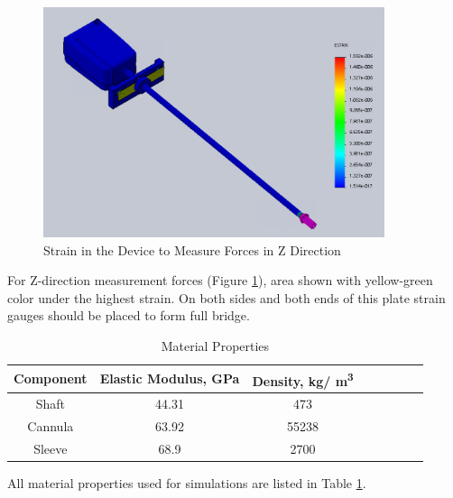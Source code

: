 \begin{figure}[h]
	\begin{center}
		\includegraphics[width=100mm]{fig/methods/z_dir_sim.png}
	\end{center}
	\vspace{-4mm}
	\caption[Strain in the Device to Measure Forces in Z Direction]
	{Strain in the Device to Measure Forces in Z Direction}
	\label{fig:Zdev}
	\vspace{-2mm}
\end{figure}

For Z-direction measurement forces (Figure \ref{fig:Zdev}), area shown with yellow-green color under the highest strain. On both sides and both ends of this plate strain gauges should be placed to form full bridge.

\begin{table}
\caption {Material Properties} \label{tab:matProp} 
\begin{center}
\begin{tabular}{ | c | c | c | c | c | c | c | c | } 
\hline
Component & Elastic Modulus, GPa & Density, kg/ m\textsuperscript{3} \\ 
\hline
Shaft & 44.31 & 473\\ 
\hline
Cannula & 63.92 & 55238 \\ 
\hline
Sleeve & 68.9 & 2700  \\ 
\hline
\end{tabular}
\end{center}
\end{table}

All material properties used for simulations are listed in Table \ref{tab:matProp}.

